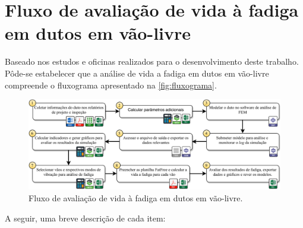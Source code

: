 \section{Fluxo de avaliação de vida à fadiga em dutos em vão-livre}\label{chap:workflow}


Baseado nos estudos e oficinas realizados para o desenvolvimento deste trabalho. Pôde-se estabelecer que a análise de vida a fadiga em dutos em vão-livre compreende o fluxograma apresentado na \autoref{fig:fluxograma}.

\begin{figure}[!ht]
    \centering
    \caption{Fluxo de avaliação de vida à fadiga em dutos em vão-livre.}\label{fig:fluxograma}
    \includegraphics[width=\textwidth]{imagens/fluxograma.pdf}
\end{figure}

A seguir, uma breve descrição de cada item:

